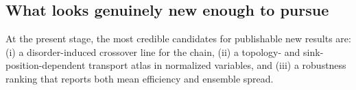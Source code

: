 \subsection{What looks genuinely new enough to pursue}
At the present stage, the most credible candidates for publishable new results are: (i) a disorder-induced crossover line for the chain, (ii) a topology- and sink-position-dependent transport atlas in normalized variables, and (iii) a robustness ranking that reports both mean efficiency and ensemble spread.
